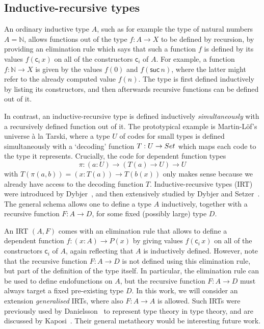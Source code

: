 \documentclass[a4paper,UKenglish,numberwithinsect,cleveref,thm-restate]{lipics-v2021}
\begin{document}
\subsection{Inductive-recursive types}

An ordinary inductive type $A$, such as for example the type of natural numbers $A = \mathbb{N}$, allows functions out of the type $f : A \to X$ to be defined by recursion, by providing an elimination rule which says that such a function $f$ is defined by its values $f(\mathsf{c}_i\,x)$ on all of the constructors $\mathsf{c}_i$ of $A$. For example, a function $f: \mathbb{N} \to X$ is given by the values $f(0)$ and $f(\mathsf{suc}\,n)$, where the latter might refer to the already computed value $f(n)$.
%
The type is first defined inductively by listing its constructors, and then afterwards recursive functions can be defined out of it.

In contrast, an inductive-recursive type is defined inductively \emph{simultaneously} with a recursively defined function out of it. The prototypical example is Martin-L\"of's universe \`a la Tarski, where a type $U$ of codes for small types is defined simultaneously with a `decoding' function $T : U \to \Set$ which maps each code to the type it represents. Crucially, the code for dependent function types
\[
  \pi : (a : U) \to (T(a) \to U) \to U
\]
with $T(\pi(a, b)) = (x : T(a)) \to T(b(x))$ only makes sense because we already have access to the decoding function $T$.
%
Inductive-recursive types (IRT) were introduced by Dybjer~\cite{Dybjer2000}, and then extensively studied by Dybjer and Setzer~\cite{Dybjer1999,Dybjer2003}.
The general schema allows one to define a type $A$ inductively, together with a recursive function $F : A \to D$, for some fixed (possibly large) type $D$.

An IRT $(A, F)$ comes with an elimination rule that allows to define a dependent function  $f : (x : A) \to P(x)$ by giving values $f(\mathsf{c}_i\,x)$ on all of the constructors $\mathsf{c}_i$ of $A$, again reflecting that $A$ is inductively defined.
%
However, note that the recursive function $F : A \to D$ is not defined using this elimination rule, but part of the definition of the type itself.
%
In particular, the elimination rule can be used to define endofunctions on $A$, but the recursive function  $F : A \to D$ must always target a fixed pre-existing type $D$.
%
In this work, we will consider an extension \emph{generalised} IRTs, where also $F : A \to A$ is allowed.
%
Such IRTs were previously used by Danielsson~\cite{Danielsson2006} to represent type theory in type theory, and are discussed by Kaposi~\cite{Kaposi2023}.
%
Their general metatheory would be interesting future work.
\end{document}
